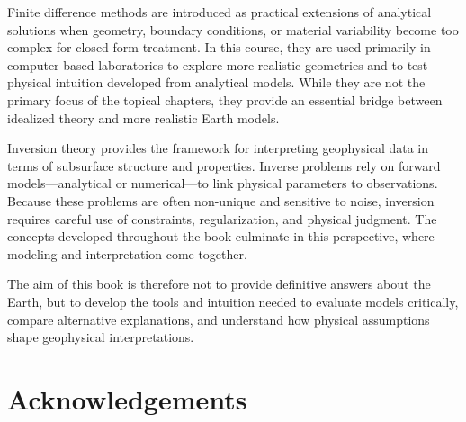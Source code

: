 Finite difference methods are introduced as practical extensions of analytical solutions when geometry, boundary conditions, or material variability become too complex for closed-form treatment. In this course, they are used primarily in computer-based laboratories to explore more realistic geometries and to test physical intuition developed from analytical models. While they are not the primary focus of the topical chapters, they provide an essential bridge between idealized theory and more realistic Earth models.

Inversion theory provides the framework for interpreting geophysical data in terms of subsurface structure and properties. Inverse problems rely on forward models—analytical or numerical—to link physical parameters to observations.  Because these problems are often non-unique and sensitive to noise, inversion requires careful use of constraints, regularization, and physical judgment.  The concepts developed throughout the book culminate in this perspective, where modeling and interpretation come together.

The aim of this book is therefore not to provide definitive answers about the Earth, but to develop the tools and intuition needed to evaluate models critically, compare alternative explanations, and understand how physical assumptions shape geophysical interpretations.

\section*{Acknowledgements}

